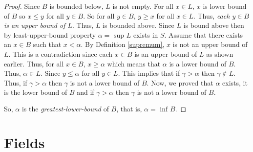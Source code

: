 \begin{proof}
    Since $B$ is bounded below, $L$ is not empty. 
    \bigbreak 
    For all $x \in L$, $x$ is lower bound of $B$ so $x \leq y$ for all $y \in B$.
    So for all $y \in B$, $y \geq x$ for all $x \in L$.
    Thus, {\it each $y \in B$ is an upper bound of $L$}. 
    Thus, $L$ is bounded above.
    \bigbreak
    Since $L$ is bound above then by least-upper-bound property $\alpha = \text{ sup } L$ exists in $S$. 
    \bigbreak
    Assume that there exists an $x \in B$ such that $x < \alpha$.
    By Definition \ref{supremum}, $x$ is not an upper bound of $L$.
    This is a contradiction since each $x \in B$ is an upper bound of $L$ as shown earlier.
    \bigbreak
    Thus, for all $x \in B$, $x \geq \alpha$ which means that $\alpha$ is a lower bound of $B$. 
    Thus, $\alpha \in L$.
    \bigbreak
    Since $y \leq \alpha$ for all $y \in L$. 
    This implies that if $\gamma > \alpha$ then $\gamma \notin L$.
    Thus, if $\gamma > \alpha$ then $\gamma$ is not a lower bound of $B$. 
    \bigbreak
    Now, we proved that $\alpha$ exists, it is the lower bound of $B$ and if $\gamma > \alpha$ 
    then $\gamma$ is not a lower bound of $B$.
     
    So, $\alpha$ is the {\it greatest-lower-bound} of $B$, that is, $\alpha = \text{ inf } B$.
\end{proof}


\section{Fields}

